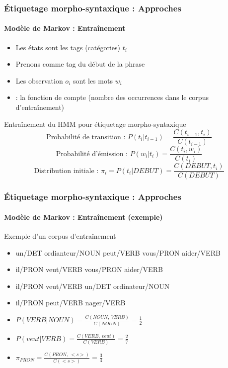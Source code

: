 \documentclass[xcolor=table]{beamer}
\begin{document}
\begin{frame}
\frametitle{Étiquetage morpho-syntaxique : Approches}
\framesubtitle{Modèle de Markov : Entraînement}

\begin{itemize}
	\item Les états sont les tags (catégories) $t_i$
	\item Prenons  comme tag du début de la phrase
	\item Les observation $o_i$ sont les mots $w_i$
	\item {} : la fonction de compte (nombre des occurrences dans le corpus d'entraînement)
\end{itemize}

\begin{block}{Entraînement du HMM pour étiquetage morpho-syntaxique}
	\[
	\text{Probabilité de transition : } P(t_i | t_{i-1}) = \frac{C(t_{i-1}, t_i)}{C(t_{i-1})} 
	\]\[
	\text{Probabilité d'émission : } P(w_i | t_i) = \frac{C(t_i, w_i)}{C(t_i)}
	\]\[
	\text{Distribution initiale : } \pi_i = P(t_i | DEBUT) = \frac{C(DEBUT, t_i)}{C(DEBUT)}
	\]
	
\end{block}

\end{frame}

\begin{frame}
\frametitle{Étiquetage morpho-syntaxique : Approches}
\framesubtitle{Modèle de Markov : Entraînement (exemple)}

\begin{exampleblock}{Exemple d'un corpus d'entraînement}
	\begin{itemize}
		\item un/DET ordianteur/NOUN peut/VERB vous/PRON aider/VERB
		\item il/PRON veut/VERB vous/PRON aider/VERB
		\item il/PRON veut/VERB un/DET ordinateur/NOUN
		\item il/PRON peut/VERB nager/VERB
	\end{itemize}
\end{exampleblock}

\begin{itemize}
	\item $P(VERB | NOUN) = \frac{C(NOUN,\ VERB)}{C(NOUN)} = \frac{1}{2}$
	\item $P(veut | VERB) = \frac{C(VERB,\ veut)}{C(VERB)} = \frac{2}{7}$
	\item $\pi_{PRON} = \frac{C(PRON,\ <s>)}{C(<s>)} = \frac{3}{4} $
\end{itemize}

\end{frame}
\end{document}
